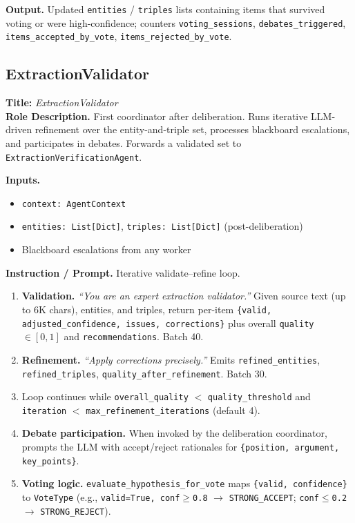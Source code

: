 \documentclass{article}
\begin{document}
\begin{agentbox}
\textbf{Output.} Updated \texttt{entities} / \texttt{triples} lists containing items that survived voting or were high-confidence; counters \texttt{voting\_sessions}, \texttt{debates\_triggered}, \texttt{items\_accepted\_by\_vote}, \texttt{items\_rejected\_by\_vote}.
\end{agentbox}

\newpage
\subsection{ExtractionValidator}
\label{app:extraction_validator}

\begin{agentbox}
\textbf{Title:} \textit{ExtractionValidator}\\
\textbf{Role Description.} First coordinator after deliberation. Runs
iterative LLM-driven refinement over the entity-and-triple set,
processes blackboard escalations, and participates in debates.
Forwards a validated set to \texttt{ExtractionVerificationAgent}.

\textbf{Inputs.}
\begin{itemize}[leftmargin=*,nosep]
\item \texttt{context: AgentContext}
\item \texttt{entities: List[Dict]}, \texttt{triples: List[Dict]} (post-deliberation)
\item Blackboard escalations from any worker
\end{itemize}

\textbf{Instruction / Prompt.} Iterative validate--refine loop.
\begin{enumerate}[leftmargin=*,nosep]
\item \textbf{Validation.} \textit{``You are an expert extraction validator.''} Given source text (up to 6K chars), entities, and triples, return per-item \texttt{\{valid, adjusted\_confidence, issues, corrections\}} plus overall \texttt{quality} $\in [0,1]$ and \texttt{recommendations}. Batch 40.
\item \textbf{Refinement.} \textit{``Apply corrections precisely.''} Emits \texttt{refined\_entities}, \texttt{refined\_triples}, \texttt{quality\_after\_refinement}. Batch 30.
\item Loop continues while \texttt{overall\_quality} $<$ \texttt{quality\_threshold} and \texttt{iteration} $<$ \texttt{max\_refinement\_iterations} (default 4).
\item \textbf{Debate participation.} When invoked by the deliberation coordinator, prompts the LLM with accept/reject rationales for \texttt{\{position, argument, key\_points\}}.
\item \textbf{Voting logic.} \texttt{evaluate\_hypothesis\_for\_vote} maps \texttt{\{valid, confidence\}} to \texttt{VoteType} (e.g., \texttt{valid=True, conf}$\ge$\texttt{0.8} $\rightarrow$ \texttt{STRONG\_ACCEPT}; \texttt{conf}$\le$\texttt{0.2} $\rightarrow$ \texttt{STRONG\_REJECT}).
\end{enumerate}


\end{agentbox}
\end{document}
